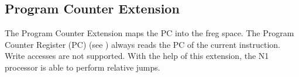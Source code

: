 %
%  
%    

\subsection{Program Counter Extension}
\label{extensions:pc}

The Program Counter Extension maps the PC into the \gls{freg} space. 
The Program Counter Register (PC) (see ) always reads the PC of the current instruction.
Write accesses are not supported.
With the help of this extension, the N1 processor is able to perform relative jumps.

